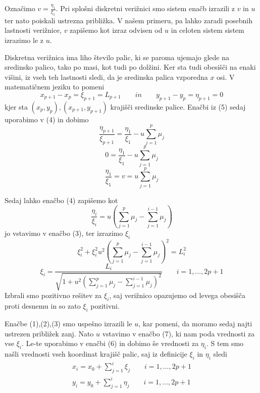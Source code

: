 \documentclass[A4paper, 11pt]{article}
\begin{document}
Označimo $v = \frac{\eta_1}{\xi_1}$. Pri splošni diskretni verižnici smo sistem enačb izrazili z $v$ in $u$ ter nato poiskali ustrezna približka. V našem primeru, pa lahko zaradi posebnih lastnosti verižnice, $v$ zapišemo kot izraz odvisen od $u$ in celoten sistem sistem izrazimo le z $u$.

Diskretna verižnica ima liho število palic, ki se paroma ujemajo glede na sredinsko palico, tako po masi, kot tudi po dolžini. Ker sta tudi obesišči na enaki višini, iz vseh teh lastnosti sledi, da je sredinska palica vzporedna $x$ osi. V matematičnem jeziku to pomeni
\begin{equation}
x_{p+1} - x_p = \xi_{p+1} = L_{p+1} \qquad in \qquad y_{p+1} - y_p = \eta_{p+1} = 0
\end{equation}
kjer sta $(x_p,y_p), (x_{p+1}, y_{p+1})$ krajišči sredinske palice.
Enačbi iz (5) sedaj uporabimo v (4) in dobimo
\[ \frac{\eta_{p+1}}{\xi_{p+1}} =  \frac{\eta_1}{\xi_1} - u \sum_{j=1}^{p} \mu_j \]
\[ 0 =  \frac{\eta_1}{\xi_1} - u \sum_{j=1}^{p} \mu_j \]
\[ \frac{\eta_1}{\xi_1} = v =  u \sum_{j=1}^{p} \mu_j \]

Sedaj lahko enačbo (4) zapišemo kot
\begin{equation} 
\frac{\eta_{i}}{\xi_{i}} = u \left (\sum_{j=1}^{p} \mu_j - \sum_{j=1}^{i-1} \mu_j \right )
\end{equation}
jo vstavimo v enačbo (3), ter izrazimo $\xi_i$
\[ \xi_i ^2 + \xi_i ^ 2 u^2 \left (\sum_{j=1}^{p} \mu_j - \sum_{j=1}^{i-1} \mu_j \right ) ^2 = L_i ^2 \]
\begin{equation}
\xi_i = \frac{L_i}{\sqrt{1 + u^2 \left (\sum_{j=1}^{p} \mu_j - \sum_{j=1}^{i-1} \mu_j \right ) ^2}} \qquad i = 1, \ldots, 2p+1
\end{equation}
Izbrali smo pozitivno rešitev za $\xi_i$, saj verižnico opazujemo od levega obesišča proti desnemu in so zato $\xi_i$ pozitivni.

Enačbe (1),(2),(3) smo uspešno izrazili le $u$, kar pomeni, da moramo sedaj najti ustrezen približek zanj. Nato $u$ vstavimo v enačbo (7), ki nam poda vrednosti za vse $\xi_i$. Le-te uporabimo v enačbi (6) in dobimo še vrednosti za $\eta_i$. S tem smo našli vrednosti vseh koordinat krajišč palic, saj iz definicije $\xi_i$ in $\eta_i$ sledi 
\begin{equation}
\begin{split}
x_i = x_0 + \sum_{j=1}^{i} \xi_j \qquad i = 1, \ldots, 2p+1 \\
y_i = y_0 + \sum_{j=1}^{i} \eta_j \qquad i = 1, \ldots, 2p+1
\end{split}
\end{equation}
\end{document}
